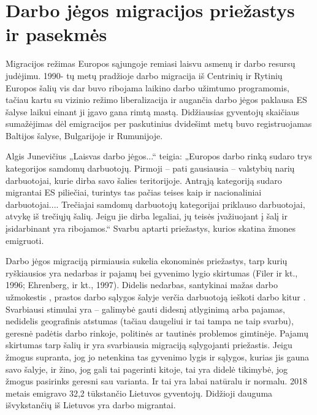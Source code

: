 \documentclass[11pt, titlepage]{article}
\begin{document}
\section{Darbo jėgos migracijos priežastys ir pasekmės}

	Migracijos režimas Europos sąjungoje remiasi laisvu asmenų ir darbo resursų judėjimu. 1990- tų metų pradžioje darbo migracija iš Centrinių ir Rytinių Europos šalių vis dar buvo ribojama laikino darbo užimtumo programomis, tačiau kartu su vizinio režimo liberalizacija ir augančia darbo jėgos paklausa ES šalyse laikui einant ji įgavo gana rimtą mastą. Didžiausias gyventojų skaičiaus sumažėjimas dėl emigracijos per paskutinius dvidešimt metų buvo registruojamas Baltijos šalyse, Bulgarijoje ir Rumunijoje. 
	
	Algis Junevičius „Laisvas darbo jėgos...“ teigia: „Europos darbo rinką sudaro trys kategorijos samdomų darbuotojų. Pirmoji – pati gausiausia – valstybių narių darbuotojai, kurie dirba savo šalies teritorijoje. Antrąją kategoriją sudaro migrantai ES piliečiai, turintys tas pačias teises kaip ir nacionaliniai darbuotojai.... Trečiajai samdomų darbuotojų kategorijai priklauso darbuotojai, atvykę iš trečiųjų šalių. Jeigu jie dirba legaliai, jų teisės įvažiuojant į šalį ir įsidarbinant yra ribojamos.“ Svarbu aptarti priežastys, kurios skatina žmones emigruoti. 
	
	Darbo jėgos migraciją pirmiausia sukelia ekonominės priežastys, tarp kurių ryškiausios yra nedarbas ir pajamų bei gyvenimo lygio skirtumas (Filer ir kt., 1996; Ehrenberg, ir kt., 1997). Didelis nedarbas, santykinai mažas darbo užmokestis , prastos darbo sąlygos šalyje verčia darbuotoją ieškoti darbo kitur \parencite{stulgiene2009migracijos}. Svarbiausi stimulai yra – galimybė gauti didesnį atlyginimą arba pajamas, nedidelis geografinis atstumas (tačiau daugeliui ir tai tampa ne taip svarbu), geresnė padėtis darbo rinkoje, politinės ar tautinės problemos gimtinėje. Pajamų skirtumas tarp šalių ir yra svarbiausia migraciją sąlygojanti priežastis.  Jeigu žmogus supranta, jog jo netenkina tas gyvenimo lygis ir sąlygos, kurias jis gauna savo šalyje, ir žino, jog gali tai pagerinti kitoje, tai yra didelė tikimybė, jog žmogus pasirinks geresni sau varianta. Ir tai yra labai natūralu ir normalu. 2018 metais emigravo 32,2 tūkstančio Lietuvos gyventojų. Didžioji dauguma išvykstančių iš Lietuvos yra darbo migrantai.
	
\end{document}
